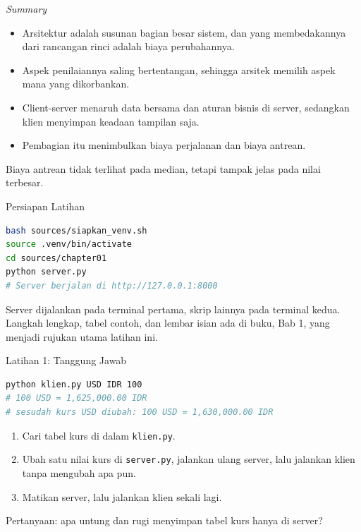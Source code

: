 \documentclass[aspectratio=169, table, 12pt]{beamer}
\begin{document}
\begin{frame}{{\Large \textit{Summary}}}
  \vspace{10pt}
  \begin{itemize}\small
    \item Arsitektur adalah susunan bagian besar sistem, dan yang membedakannya
          dari rancangan rinci adalah biaya perubahannya.
    \item Aspek penilaiannya saling bertentangan, sehingga arsitek memilih
          aspek mana yang dikorbankan.
    \item Client-server menaruh data bersama dan aturan bisnis di server,
          sedangkan klien menyimpan keadaan tampilan saja.
    \item Pembagian itu menimbulkan biaya perjalanan dan biaya antrean.
  \end{itemize}

  \vspace{10pt}
  {\small Biaya antrean tidak terlihat pada median, tetapi tampak jelas pada
  nilai terbesar.}
\end{frame}

\begin{frame}[fragile]{{\Large Persiapan Latihan}}
  \vspace{5pt}
\begin{lstlisting}[language=bash]
bash sources/siapkan_venv.sh
source .venv/bin/activate
cd sources/chapter01
python server.py
# Server berjalan di http://127.0.0.1:8000
\end{lstlisting}

  \vspace{6pt}
  {\small Server dijalankan pada terminal pertama, skrip lainnya pada terminal
  kedua. Langkah lengkap, tabel contoh, dan lembar isian ada di buku, Bab 1,
  yang menjadi rujukan utama latihan ini.}
\end{frame}

\begin{frame}[fragile]{{\Large Latihan 1: Tanggung Jawab}}
  \vspace{3pt}
\begin{lstlisting}[language=bash]
python klien.py USD IDR 100
# 100 USD = 1,625,000.00 IDR
# sesudah kurs USD diubah: 100 USD = 1,630,000.00 IDR
\end{lstlisting}

  \vspace{3pt}
  \begin{enumerate}\small
    \item Cari tabel kurs di dalam \texttt{klien.py}.
    \item Ubah satu nilai kurs di \texttt{server.py}, jalankan ulang server,
          lalu jalankan klien tanpa mengubah apa pun.
    \item Matikan server, lalu jalankan klien sekali lagi.
  \end{enumerate}

  \vspace{3pt}
  {\small Pertanyaan: apa untung dan rugi menyimpan tabel kurs hanya di
  server?}
\end{frame}
\end{document}
